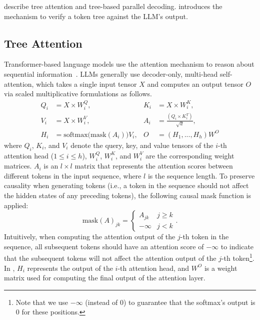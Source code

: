  describe tree attention and tree-based parallel decoding.
 introduces the mechanism to verify a token tree against the LLM's output.

\subsection{Tree Attention}
\label{specinfer:subsec:tree_attention}
Transformer-based language models use the attention mechanism to reason about sequential information~\cite{vaswani}.
LLMs generally use decoder-only, multi-head self-attention, which takes a single input tensor $X$ and computes an output tensor $O$ via scaled multiplicative formulations as follows.
\begin{equation}
\label{specinfer:eqn2}
\begin{aligned}
    Q_i &= X \times W_i^Q, & K_i &= X \times W_i^K, \\
    V_i &= X \times W_i^V, & A_i &= \frac{(Q_i \times K_i^T)}{\sqrt{d}}, \\
    H_i &= \textrm{softmax}\big(\textrm{mask}(A_i)\big) V_i, & O &= (H_1, ...,H_h) W^O
\end{aligned}
\end{equation}
where $Q_i$, $K_i$, and $V_i$ denote the query, key, and value tensors of the $i$-th attention head ($1\leq i \leq h$), $W_i^Q$, $W_i^K$, and $W_i^V$ are the corresponding weight matrices.
$A_i$ is an $l\times l$ matrix that represents the attention scores between different tokens in the input sequence, where $l$ is the sequence length. To preserve causality when generating tokens (i.e., a token in the sequence should not affect the hidden states of any preceding tokens), the following causal mask function is applied:
\begin{equation}
    \textrm{mask}(A)_{jk} =     \begin{cases}
    A_{jk} & j \geq k\\
    - \infty & j < k
    \end{cases}.
\end{equation}
Intuitively, when computing the attention output of the $j$-th token in the sequence, all subsequent tokens should have an attention score of $-\infty$ to indicate that the subsequent tokens will not affect the attention output of the $j$-th token\footnote{Note that we use $-\infty$ (instead of 0) to guarantee that the softmax's output is 0 for these positions.}.
In , $H_i$ represents the output of the $i$-th attention head, and $W^O$ is a weight matrix used for computing the final output of the attention layer.

